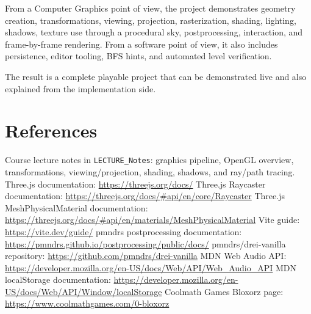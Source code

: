 \documentclass[11pt,a4paper]{article}
\newcommand{\code}[1]{\texttt{#1}}
\begin{document}
From a Computer Graphics point of view, the project demonstrates geometry creation, transformations, viewing, projection, rasterization, shading, lighting, shadows, texture use through a procedural sky, postprocessing, interaction, and frame-by-frame rendering. From a software point of view, it also includes persistence, editor tooling, BFS hints, and automated level verification.

The result is a complete playable project that can be demonstrated live and also explained from the implementation side.

\section{References}
Course lecture notes in \code{LECTURE\_Notes}: graphics pipeline, OpenGL overview, transformations, viewing/projection, shading, shadows, and ray/path tracing.
Three.js documentation: \url{https://threejs.org/docs/}
Three.js Raycaster documentation: \url{https://threejs.org/docs/#api/en/core/Raycaster}
Three.js MeshPhysicalMaterial documentation: \url{https://threejs.org/docs/#api/en/materials/MeshPhysicalMaterial}
Vite guide: \url{https://vite.dev/guide/}
pmndrs postprocessing documentation: \url{https://pmndrs.github.io/postprocessing/public/docs/}
pmndrs/drei-vanilla repository: \url{https://github.com/pmndrs/drei-vanilla}
MDN Web Audio API: \url{https://developer.mozilla.org/en-US/docs/Web/API/Web_Audio_API}
MDN localStorage documentation: \url{https://developer.mozilla.org/en-US/docs/Web/API/Window/localStorage}
Coolmath Games Bloxorz page: \url{https://www.coolmathgames.com/0-bloxorz}
\end{document}
